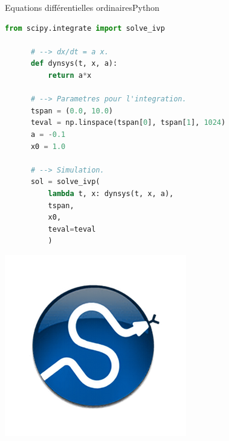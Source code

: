 \documentclass[usenames,dvipsnames,svgnames,10pt,aspectratio=169]{beamer}
\begin{document}
\begin{frame}[t, c, fragile]{Equations différentielles ordinaires}{Python}
  \begin{minipage}{.68\textwidth}
    \begin{lstlisting}[language=Python]
      from scipy.integrate import solve_ivp

      # --> dx/dt = a x.
      def dynsys(t, x, a):
          return a*x

      # --> Parametres pour l'integration.
      tspan = (0.0, 10.0)
      teval = np.linspace(tspan[0], tspan[1], 1024)
      a = -0.1
      x0 = 1.0

      # --> Simulation.
      sol = solve_ivp(
          lambda t, x: dynsys(t, x, a),
          tspan,
          x0,
          teval=teval
          )
    \end{lstlisting}
  \end{minipage}%
  \hfill
  \begin{minipage}{.28\textwidth}
    \centering
    \includegraphics[width=\textwidth]{scipy_logo}
  \end{minipage}
\end{frame}
\end{document}
